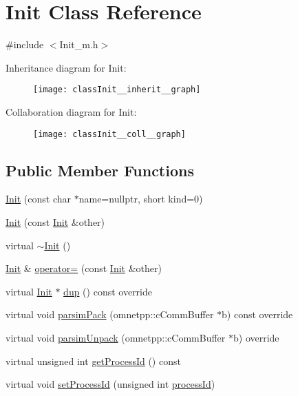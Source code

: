\hypertarget{classInit}{}\section{Init Class Reference}
\label{classInit}


{\ttfamily \#include $<$Init\+\_\+m.\+h$>$}



Inheritance diagram for Init\+:\nopagebreak
\begin{figure}[H]
\begin{center}
\leavevmode
\texttt{[image: classInit\_\_inherit\_\_graph]}
\end{center}
\end{figure}


Collaboration diagram for Init\+:\nopagebreak
\begin{figure}[H]
\begin{center}
\leavevmode
\texttt{[image: classInit\_\_coll\_\_graph]}
\end{center}
\end{figure}
\subsection*{Public Member Functions}
\begin{DoxyCompactItemize}
\item 
\hyperlink{classInit_a763a386107f8ea21acfd24f243e0f73c}{Init} (const char $\ast$name=nullptr, short kind=0)
\item 
\hyperlink{classInit_a9d26400c5fabf20571808ad773524669}{Init} (const \hyperlink{classInit}{Init} \&other)
\item 
virtual \hyperlink{classInit_a67d5c94cb965fa3b774e969cfb4969d1}{$\sim$\+Init} ()
\item 
\hyperlink{classInit}{Init} \& \hyperlink{classInit_ab995dd231981ed97018c00b5fd8e9797}{operator=} (const \hyperlink{classInit}{Init} \&other)
\item 
virtual \hyperlink{classInit}{Init} $\ast$ \hyperlink{classInit_ad1e6c6b247eae6eaac5dd8e9dc9cdce0}{dup} () const override
\item 
virtual void \hyperlink{classInit_a73df5d54ec41b9980e98dbfc12875145}{parsim\+Pack} (omnetpp\+::c\+Comm\+Buffer $\ast$b) const override
\item 
virtual void \hyperlink{classInit_ab3728913400c516dbb31c8fed392d32d}{parsim\+Unpack} (omnetpp\+::c\+Comm\+Buffer $\ast$b) override
\item 
virtual unsigned int \hyperlink{classInit_a73d525231ae76ad98442d6f5b86bb994}{get\+Process\+Id} () const
\item 
virtual void \hyperlink{classInit_ae0331d367c559e5859841ab0cafb9a71}{set\+Process\+Id} (unsigned int \hyperlink{classInit_a3adbaa4c454127a34eaab69297b44585}{process\+Id})
\end{DoxyCompactItemize}
